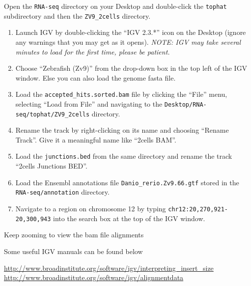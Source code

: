 \begin{steps}
Open the \texttt{RNA-seq} directory on your Desktop and double-click the
\texttt{tophat} subdirectory and then the \texttt{ZV9\_2cells} directory.

\begin{enumerate}
  \item Launch IGV by double-clicking the ``IGV 2.3.*'' icon on the Desktop
  (ignore any warnings that you may get as it opens). \emph{NOTE: IGV may take
  several minutes to load for the first time, please be patient.}
  \item Choose ``Zebrafish (Zv9)'' from the drop-down box in the top left of the
  IGV window. Else you can also load the genome fasta file.
  \item Load the \texttt{accepted\_hits.sorted.bam} file by clicking the
  ``File'' menu, selecting ``Load from File'' and navigating to the
  \texttt{Desktop/RNA-seq/tophat/ZV9\_2cells} directory.
  \item Rename the track by right-clicking on its name and choosing ``Rename
  Track''. Give it a meaningful name like ``2cells BAM''.
  \item Load the \texttt{junctions.bed} from the same directory and rename the
  track ``2cells Junctions BED''.
  \item Load the Ensembl annotations file \texttt{Danio\_rerio.Zv9.66.gtf}
  stored in the \texttt{RNA-seq/annotation} directory.
  \item Navigate to a region on chromosome 12 by typing
  \texttt{chr12:20,270,921-20,300,943} into the search box at the top of the IGV
  window.
\end{enumerate}

\end{steps}

\begin{information}
Keep zooming to view the bam file alignments

Some useful IGV manuals can be found below

\url{http://www.broadinstitute.org/software/igv/interpreting_insert_size}\\
\url{http://www.broadinstitute.org/software/igv/alignmentdata}
\end{information}


